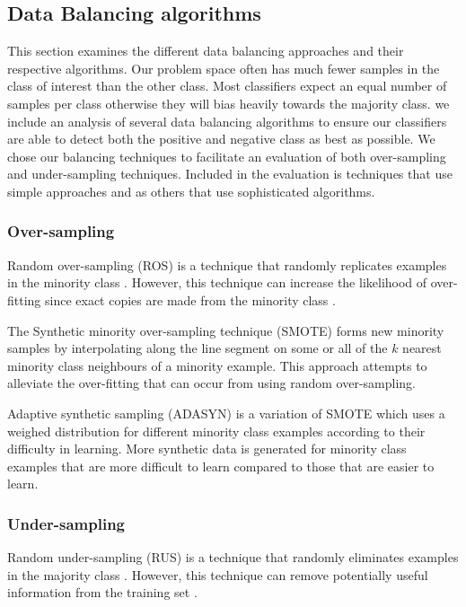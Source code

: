 \documentclass{sig-alternate-05-2015}
\begin{document}
	\subsection{Data Balancing algorithms}
	\label{sec:data_balancing_algorithms}
	This section examines the different data balancing approaches and their respective algorithms. Our problem space often has much fewer samples in the class of interest than the other class. Most classifiers expect an equal number of samples per class otherwise they will bias heavily towards the majority class. we include an analysis of several data balancing algorithms to ensure our classifiers are able to detect both the positive and negative class as best as possible. We chose our balancing techniques to facilitate an evaluation of both over-sampling and under-sampling techniques. Included in the evaluation is techniques that use simple approaches and as others that use sophisticated algorithms.
	\subsubsection{Over-sampling}
	Random over-sampling (ROS) is a technique that randomly replicates examples in the minority class \cite{Batista:2004:SBS:1007730.1007735}. However, this technique can increase the likelihood of over-fitting since exact copies are made from the minority class \cite{Batista:2004:SBS:1007730.1007735}.
	
	The Synthetic minority over-sampling technique (SMOTE) \cite{Chawla:2002:SSM:1622407.1622416} forms new minority samples by interpolating along the line segment on some or all of the $k$ nearest minority class neighbours of a minority example. This approach attempts to alleviate the over-fitting that can occur from using random over-sampling.
	
	Adaptive synthetic sampling (ADASYN) \cite{4633969} is a variation of SMOTE which uses a weighed distribution for different minority class examples according to their difficulty in learning. More synthetic data is generated for minority class examples that are more difficult to learn compared to those that are easier to learn.
	
	\subsubsection{Under-sampling}
	Random under-sampling (RUS) is a technique that randomly eliminates examples in the majority class \cite{Batista:2004:SBS:1007730.1007735}. However, this technique can remove potentially useful information from the training set \cite{Batista:2004:SBS:1007730.1007735}. 
	
\end{document}
